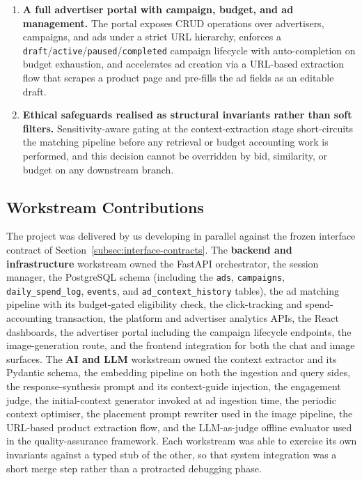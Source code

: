 \begin{enumerate}[label=(\roman*), leftmargin=2.5em]
  \item \textbf{A full advertiser portal with campaign, budget, and
    ad management.} The portal exposes CRUD operations over
    advertisers, campaigns, and ads under a strict URL hierarchy,
    enforces a \texttt{draft}/\texttt{active}/\texttt{paused}/\texttt{completed}
    campaign lifecycle with auto-completion on budget exhaustion, and
    accelerates ad creation via a URL-based extraction flow that
    scrapes a product page and pre-fills the ad fields as an editable
    draft.

  \item \textbf{Ethical safeguards realised as structural invariants
    rather than soft filters.} Sensitivity-aware gating at the
    context-extraction stage short-circuits the matching pipeline
    before any retrieval or budget accounting work is performed, and
    this decision cannot be overridden by bid, similarity, or budget
    on any downstream branch.
\end{enumerate}

\subsection{Workstream Contributions}
\label{subsec:workstream-contributions}

The project was delivered by us developing in
parallel against the frozen interface contract of
Section~\ref{subsec:interface-contracts}. The \textbf{backend and
infrastructure} workstream owned the FastAPI orchestrator, the
session manager, the PostgreSQL schema (including the \texttt{ads},
\texttt{campaigns}, \texttt{daily\_spend\_log}, \texttt{events}, and
\texttt{ad\_context\_history} tables), the ad matching pipeline with
its budget-gated eligibility check, the click-tracking and
spend-accounting transaction, the platform and advertiser analytics
APIs, the React dashboards, the advertiser portal including the
campaign lifecycle endpoints, the image-generation route, and the
frontend integration for both the chat and image surfaces. The
\textbf{AI and LLM} workstream owned the context extractor and its
Pydantic schema, the embedding pipeline on both the ingestion and
query sides, the response-synthesis prompt and its context-guide
injection, the engagement judge, the initial-context generator invoked
at ad ingestion time, the periodic context optimiser, the placement
prompt rewriter used in the image pipeline, the URL-based product
extraction flow, and the LLM-as-judge offline evaluator used in the
quality-assurance framework. Each workstream was able to exercise its
own invariants against a typed stub of the other, so that system
integration was a short merge step rather than a protracted debugging
phase.

